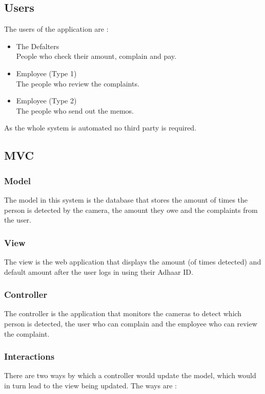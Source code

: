 \documentclass[10pt,twocolumn,letterpaper]{article}
\begin{document}
\subsection*{Users}
The users of the application are :
\begin{itemize}
    \item The Defalters \\
        People who check their amount, complain and pay.
    \item Employee (Type 1) \\
        The people who review the complaints.
    \item Employee (Type 2)\\
        The people who send out the memos.
\end{itemize}
As the whole system is automated no third party is required.

\subsection*{MVC}

\subsubsection*{Model}
The model in this system is the database that stores the amount of times the person 
is detected by the camera, the amount they owe and the complaints 
from the user.

\subsubsection*{View}
The view is the web application that displays the amount
(of times detected) and default amount after the user logs in using their 
Adhaar ID.

\subsubsection*{Controller}
The controller is the application that monitors the cameras 
to detect which person is detected, the user who can complain and the 
employee who can review the complaint.

\subsubsection*{Interactions}
There are two ways by which a controller would update the model, which would in turn 
lead to the view being updated. The ways are :
\end{document}
